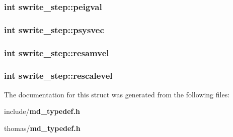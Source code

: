 \subsubsection{\setlength{\rightskip}{0pt plus 5cm}int {\bf swrite\_\-step::peigval}}\label{structswrite__step_88ae3d704aaca44c4a1791525a7b8870}


\subsubsection{\setlength{\rightskip}{0pt plus 5cm}int {\bf swrite\_\-step::psysvec}}\label{structswrite__step_50d36b04cd6b78f113fee3c73abb60e5}


\subsubsection{\setlength{\rightskip}{0pt plus 5cm}int {\bf swrite\_\-step::resamvel}}\label{structswrite__step_b9c5880a1273093e2db4f260e251c546}


\subsubsection{\setlength{\rightskip}{0pt plus 5cm}int {\bf swrite\_\-step::rescalevel}}\label{structswrite__step_3e87790438c49802c1dafa2712aec957}




The documentation for this struct was generated from the following files:\begin{CompactItemize}
\item 
include/{\bf md\_\-typedef.h}\item 
thomas/{\bf md\_\-typedef.h}\end{CompactItemize}
